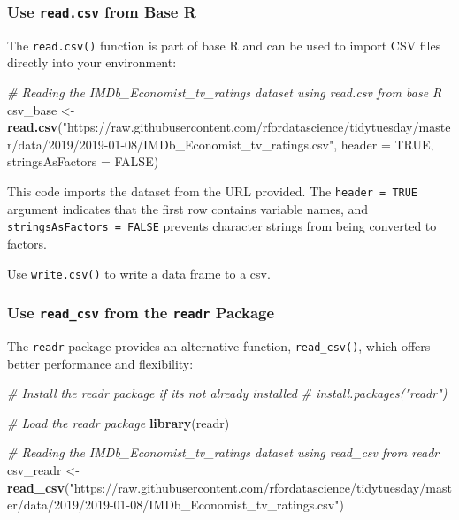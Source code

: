 \documentclass[
]{book}
\newenvironment{Shaded}{\begin{snugshade}}{\end{snugshade}}
\newcommand{\AttributeTok}[1]{\textcolor[rgb]{0.13,0.29,0.53}{#1}}
\newcommand{\CommentTok}[1]{\textcolor[rgb]{0.56,0.35,0.01}{\textit{#1}}}
\newcommand{\ConstantTok}[1]{\textcolor[rgb]{0.56,0.35,0.01}{#1}}
\newcommand{\FunctionTok}[1]{\textcolor[rgb]{0.13,0.29,0.53}{\textbf{#1}}}
\newcommand{\NormalTok}[1]{#1}
\newcommand{\OtherTok}[1]{\textcolor[rgb]{0.56,0.35,0.01}{#1}}
\newcommand{\StringTok}[1]{\textcolor[rgb]{0.31,0.60,0.02}{#1}}
\begin{document}
\subsubsection*{\texorpdfstring{Use \texttt{read.csv} from Base R}{Use read.csv from Base R}}\label{use-read.csv-from-base-r}

The \texttt{read.csv()} function is part of base R and can be used to import CSV files directly into your environment:

\begin{Shaded}
\begin{Highlighting}[]
\CommentTok{\# Reading the IMDb\_Economist\_tv\_ratings dataset using read.csv from base R}
\NormalTok{csv\_base }\OtherTok{\textless{}{-}} \FunctionTok{read.csv}\NormalTok{(}\StringTok{"https://raw.githubusercontent.com/rfordatascience/tidytuesday/master/data/2019/2019{-}01{-}08/IMDb\_Economist\_tv\_ratings.csv"}\NormalTok{, }\AttributeTok{header =} \ConstantTok{TRUE}\NormalTok{, }\AttributeTok{stringsAsFactors =} \ConstantTok{FALSE}\NormalTok{)}
\end{Highlighting}
\end{Shaded}

This code imports the dataset from the URL provided. The \texttt{header\ =\ TRUE} argument indicates that the first row contains variable names, and \texttt{stringsAsFactors\ =\ FALSE} prevents character strings from being converted to factors.

Use \texttt{write.csv()} to write a data frame to a csv.

\subsubsection*{\texorpdfstring{Use \texttt{read\_csv} from the \texttt{readr} Package}{Use read\_csv from the readr Package}}\label{use-read_csv-from-the-readr-package}

The \texttt{readr} package provides an alternative function, \texttt{read\_csv()}, which offers better performance and flexibility:

\begin{Shaded}
\begin{Highlighting}[]
\CommentTok{\# Install the readr package if it\textquotesingle{}s not already installed}
\CommentTok{\# install.packages("readr")}

\CommentTok{\# Load the readr package}
\FunctionTok{library}\NormalTok{(readr)}

\CommentTok{\# Reading the IMDb\_Economist\_tv\_ratings dataset using read\_csv from readr}
\NormalTok{csv\_readr }\OtherTok{\textless{}{-}} \FunctionTok{read\_csv}\NormalTok{(}\StringTok{"https://raw.githubusercontent.com/rfordatascience/tidytuesday/master/data/2019/2019{-}01{-}08/IMDb\_Economist\_tv\_ratings.csv"}\NormalTok{)}
\end{Highlighting}
\end{Shaded}
\end{document}
